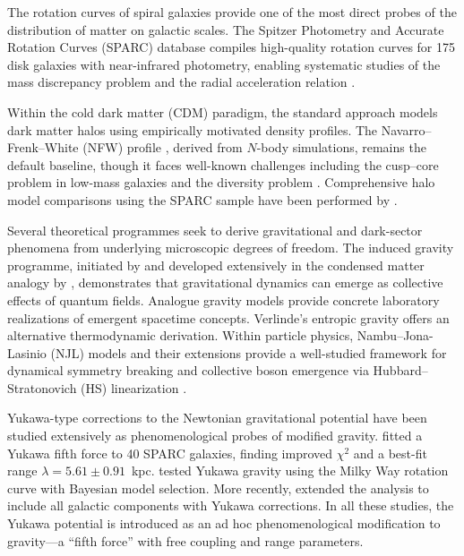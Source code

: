 \documentclass[11pt,a4paper]{article}
\begin{document}
The rotation curves of spiral galaxies provide one of the most direct
probes of the distribution of matter on galactic scales.
The Spitzer Photometry and Accurate Rotation Curves (SPARC) database
\cite{Lelli:2016zqa} compiles high-quality rotation curves for 175
disk galaxies with near-infrared photometry, enabling systematic
studies of the mass discrepancy problem and the radial acceleration
relation \cite{Lelli:2017vgz,McGaugh:2016leg}.

Within the cold dark matter (CDM) paradigm, the standard approach
models dark matter halos using empirically motivated density profiles.
The Navarro--Frenk--White (NFW) profile \cite{Navarro:1996gj},
derived from $N$-body simulations, remains the default baseline,
though it faces well-known challenges including the cusp--core
problem in low-mass galaxies \cite{deBlok:2009sp,Bullock:2017xww}
and the diversity problem \cite{Oman:2015xda}.
Comprehensive halo model comparisons using the SPARC sample have
been performed by \cite{Li:2020iib}.

Several theoretical programmes seek to derive gravitational and
dark-sector phenomena from underlying microscopic degrees of freedom.
The induced gravity programme, initiated by \cite{Sakharov:1967pk}
and developed extensively in the condensed matter analogy by
\cite{Volovik:2003fe}, demonstrates that gravitational dynamics can
emerge as collective effects of quantum fields.
Analogue gravity models \cite{Barcelo:2005fc} provide concrete
laboratory realizations of emergent spacetime concepts.
Verlinde's entropic gravity \cite{Verlinde:2016toy} offers an
alternative thermodynamic derivation.
Within particle physics, Nambu--Jona-Lasinio (NJL) models
\cite{Nambu:1961tp,Nambu:1961fr} and their extensions
\cite{Klevansky:1992qe} provide a well-studied framework for
dynamical symmetry breaking and collective boson emergence via
Hubbard--Stratonovich (HS) linearization
\cite{Hubbard:1959ub,Stratonovich:1957}.

Yukawa-type corrections to the Newtonian gravitational potential
have been studied extensively as phenomenological probes of modified
gravity.
\cite{deAlmeida:2018kwq} fitted a Yukawa fifth force to 40 SPARC
galaxies, finding improved $\chi^2$ and a best-fit range
$\lambda = 5.61 \pm 0.91$~kpc.
\cite{Henrichs:2021bnd} tested Yukawa gravity using the Milky Way
rotation curve with Bayesian model selection.
More recently, \cite{Hassan:2025yuk} extended the analysis to
include all galactic components with Yukawa corrections.
In all these studies, the Yukawa potential is introduced as an
ad hoc phenomenological modification to gravity---a ``fifth force''
with free coupling and range parameters.
\end{document}
